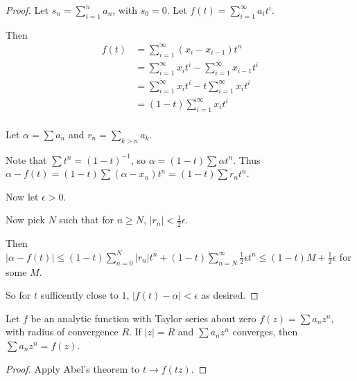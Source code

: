 \begin{proof}
Let \(s_n = \sum\limits_{i = 1}^n a_n\), with \(s_0 = 0\).
Let \(f(t) = \sum\limits_{i = 1}^\infty a_i t^i\).

Then
\begin{align*}
f(t) &= \sum\limits_{i = 1}^\infty (x_i - x_{i - 1}) t^n\\
&= \sum\limits_{i = 1}^\infty x_i t^i -  \sum\limits_{i = 1}^\infty x_{i - 1} t^i\\
&= \sum\limits_{i = 1}^\infty x_i t^i -  t \sum\limits_{i = 1}^\infty x_i t^i\\
&= (1 - t) \sum\limits_{i = 1}^{\infty} x_i t^i\\
\end{align*}

Let \(\alpha = \sum a_n\) and \(r_n = \sum\limits_{k > n} a_k\).

Note that \(\sum t^n = {(1 - t)}^{-1}\),
so \(\alpha = (1 - t) \sum \alpha t^n\).
Thus \(\alpha - f(t) = (1 - t) \sum (\alpha - x_n) t^n = (1 - t) \sum r_n t^n \).

Now let \(\epsilon > 0\).

Now pick \(N\) such that for \(n \geq N\),
\(|r_n| < \frac{1}{2}\epsilon\).

Then \(|\alpha - f(t)| \leq (1 - t) \sum\limits_{n = 0}^N |r_n| t^n + (1 - t) \sum\limits_{n = N}^\infty \frac{1}{2}\epsilon t^n \leq (1 - t) M + \frac{1}{2} \epsilon\) for some \(M\).

So for \(t\) sufficently close to \(1\),
\(|f(t) - \alpha| < \epsilon\) as desired.
\end{proof}

\begin{corollary}
Let \(f\) be an analytic function with Taylor series about zero \(f(z) = \sum a_n z^n\),
with radius of convergence \(R\).
If \(|z| = R\) and \(\sum a_n z^n\) converges,
then \(\sum a_n z^n = f(z)\).
\end{corollary}

\begin{proof}
Apply Abel's theorem to \(t \to f(tz)\).
\end{proof}
